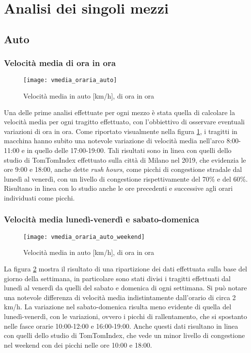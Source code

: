 \section{Analisi dei singoli mezzi}

\subsection{Auto}

\subsubsection{Velocità media di ora in ora}

\begin{figure}[!h]
	\texttt{[image: vmedia\_oraria\_auto]}
	\caption{Velocità media in auto [km/h], di ora in ora}
	\label{image:1}
\end{figure}

Una delle prime analisi effettuate per ogni mezzo è stata quella di calcolare la velocità media per ogni tragitto effettuato, con l'obbiettivo di osservare eventuali variazioni di ora in ora. Come riportato visualmente nella figura \ref{image:1}, i tragitti in macchina hanno subito una notevole variazione di velocità media nell'arco 8:00-11:00 e in quello delle 17:00-19:00. Tali risultati sono in linea con quelli dello studio di TomTomIndex\cite{tomtomindexmilan} effettuato sulla città di Milano nel 2019, che evidenzia le ore 9:00 e 18:00, anche dette \textit{rush hours}, come picchi di congestione stradale dal lunedì al venerdì, con un livello di congestione rispettivamente del 70\% e del 60\%. Risultano in linea con lo studio anche le ore precedenti e successive agli orari individuati come picchi.

\subsubsection{Velocità media lunedì-venerdì e sabato-domenica}

\begin{figure}[!h]
	\texttt{[image: vmedia\_oraria\_auto\_weekend]}
	\caption{Velocità media in auto [km/h], di ora in ora}
	\label{image:2}
\end{figure}

La figura \ref{image:2} mostra il risultato di una ripartizione dei dati effettuata sulla base del giorno della settimana, in particolare sono stati divisi i tragitti effettuati dal lunedì al venerdì da quelli del sabato e domenica di ogni settimana. Si può notare una notevole differenza di velocità media indistintamente dall'orario di circa 2 km/h. La variazione nel sabato-domenica risulta meno evidente di quella del lunedì-venerdì, con le variazioni, ovvero i picchi di rallentamento, che si spostanto nelle fasce orarie 10:00-12:00 e 16:00-19:00. Anche questi dati risultano in linea con quelli dello studio di TomTomIndex\cite{tomtomindexmilan}, che vede un minor livello di congestione nel weekend con dei picchi nelle ore 10:00 e 18:00.

